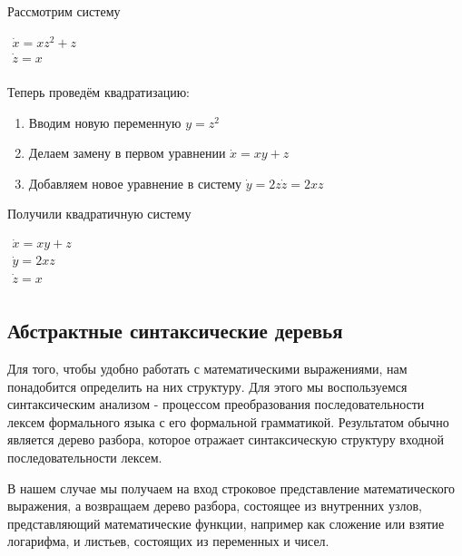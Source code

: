 \begin{example}
    Рассмотрим систему

    $\begin{array}{lcl}
        \dot x = xz^2 + z \\
        \dot z = x \\
    \end{array}$
    \newline
    
    Теперь проведём квадратизацию:
    \begin{enumerate}
        \item Вводим новую переменную $y = z^2$
        \item Делаем замену в первом уравнении $\dot x = xy + z$
        \item Добавляем новое уравнение в систему $\dot y = 2z \dot z = 2xz$
    \end{enumerate}
    
     Получили квадратичную систему
    
    $\begin{array}{lcl}
        \dot x = xy + z \\
        \dot y = 2xz \\
        \dot z = x \\
    \end{array}$
\end{example}


\subsection{Абстрактные синтаксические деревья} \label{AST-section}

Для того, чтобы удобно работать с математическими выражениями, нам понадобится определить на них структуру.
Для этого мы воспользуемся синтаксическим анализом - процессом преобразования последовательности лексем формального языка с его формальной грамматикой.
Результатом обычно является дерево разбора, которое отражает синтаксическую структуру входной последовательности лексем.

В нашем случае мы получаем на вход строковое представление математического выражения, а возвращаем дерево разбора, состоящее из внутренних узлов, представляющий математические функции, например как сложение или взятие логарифма, и листьев, состоящих из переменных и чисел.

